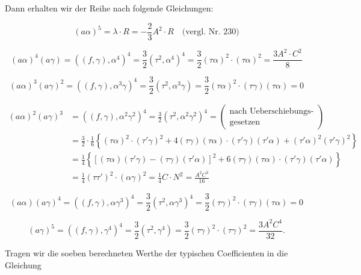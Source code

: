 



Dann erhalten wir der Reihe nach folgende Gleichungen:

\[ (a\alpha)^5=\lambda\cdot R=-\frac{2}{3}A^2\cdot R \quad \text{(vergl. Nr. 230)} \]

\[ (a\alpha)^4(a\gamma) = ((f,\gamma),\alpha^4)^4=\frac{3}{2}(\tau^2,\alpha^4)^4=\frac{3}{2}(\tau\alpha)^2\cdot(\tau\alpha)^2=\frac{3A^2\cdot C^2}{8} \]


\[ (a\alpha)^3(a\gamma)^2=((f,\gamma),\alpha^3\gamma)^4=\frac{3}{2}(\tau^2,\alpha^3\gamma)=\frac{3}{2}(\tau\alpha)^2\cdot(\tau\gamma)(\tau\alpha)=0 \]

\begin{align*}
(a\alpha)^2(a\gamma)^3 &= ((f,\gamma),\alpha^2\gamma^2)^4=\frac{3}{2}(\tau^2,\alpha^2\gamma^2)^4= \begin{pmatrix}\text{nach Ueberschiebungs-}\\ \text{gesetzen}\end{pmatrix}\\
&=\frac{3}{2}\cdot\frac{1}{6}\left\{(\tau\alpha)^2\cdot(\tau'\gamma)^2+4(\tau\gamma)(\tau\alpha)\cdot(\tau'\gamma)(\tau'\alpha)+(\tau'\alpha)^2(\tau'\gamma)^2\right\}\\
&=\frac{1}{4}\left\{[(\tau\alpha)(\tau'\gamma)-(\tau\gamma)(\tau'\alpha)]^2+6(\tau\gamma)(\tau\alpha)\cdot(\tau'\gamma)(\tau'\alpha)\right\}\\
&=\frac{1}{4}(\tau\tau')^2\cdot(\alpha\gamma)^2=\frac{1}{4}C\cdot N^2=\frac{A^2C^3}{16}
\end{align*}

\[ (a\alpha)(a\gamma)^4=((f,\gamma),\alpha\gamma^3)^4=\frac{3}{2}(\tau^2,\alpha\gamma^3)^4=\frac{3}{2}(\tau\gamma)^2\cdot(\tau\gamma)(\tau\alpha)=0 \]

\[ (a\gamma)^5=((f,\gamma),\gamma^4)^4=\frac{3}{2}(\tau^2,\gamma^4)=\frac{3}{2}(\tau\gamma)^2\cdot(\tau\gamma)^2=\frac{3A^2C^4}{32}. \]

Tragen wir die soeben berechneten Werthe der typischen Coefficienten
 in die Gleichung

